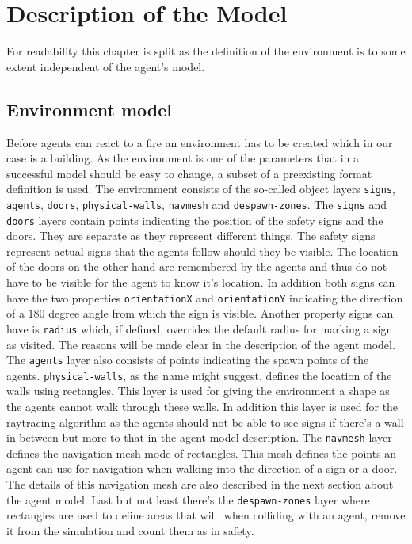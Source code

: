 \documentclass[11pt]{article}
\begin{document}
\section{Description of the Model}

For readability this chapter is split as the definition of the environment is to some extent independent of the agent's model.

\subsection{Environment model}

Before agents can react to a fire an environment has to be created which in our case is a building. As the environment is one of the parameters that in a successful model should be easy to change, a subset of a preexisting format definition is used. The environment consists of the so-called object layers \texttt{signs}, \texttt{agents}, \texttt{doors}, \texttt{physical-walls}, \texttt{navmesh} and \texttt{despawn-zones}. The \texttt{signs} and \texttt{doors} layers contain points indicating the position of the safety signs and the doors. They are separate as they represent different things. The safety signs represent actual signs that the agents follow should they be visible. The location of the doors on the other hand are remembered by the agents and thus do not have to be visible for the agent to know it's location. In addition both signs can have the two properties \texttt{orientationX} and \texttt{orientationY} indicating the direction of a $180$ degree angle from which the sign is visible. Another property signs can have is \texttt{radius} which, if defined, overrides the default radius for marking a sign as visited. The reasons will be made clear in the description of the agent model. The \texttt{agents} layer also consists of points indicating the spawn points of the agents. \texttt{physical-walls}, as the name might suggest, defines the location of the walls using rectangles. This layer is used for giving the environment a shape as the agents cannot walk through these walls. In addition this layer is used for the raytracing algorithm as the agents should not be able to see signs if there's a wall in between but more to that in the agent model description. The \texttt{navmesh} layer defines the navigation mesh mode of rectangles. This mesh defines the points an agent can use for navigation when walking into the direction of a sign or a door. The details of this navigation mesh are also described in the next section about the agent model. Last but not least there's the \texttt{despawn-zones} layer where rectangles are used to define areas that will, when colliding with an agent, remove it from the simulation and count them as in safety.
\end{document}

